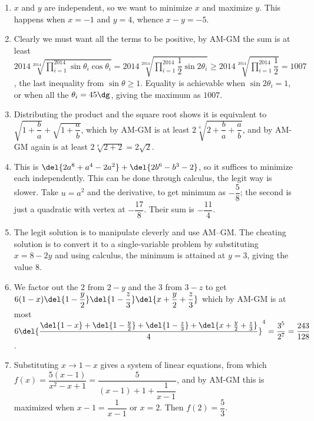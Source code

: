 \documentclass[10pt,paper=letter]{scrartcl}
\begin{document}
\begin{enumerate}

\item $x$ and $y$ are independent, so we want to minimize $x$ and maximize $y$. This happens when $x = -1$ and $y = 4$, whence $x - y = -5$.

\item Clearly we must want all the terms to be positive, by AM-GM the sum is at least $2014\sqrt[2014]{\displaystyle \prod_{i=1}^{2014} \sin \theta_i \cos \theta_i} = 2014\sqrt[2014]{\displaystyle \prod_{i=1}^{2014} \dfrac12\sin2\theta_i} \geq 2014\sqrt[2014]{\displaystyle \prod_{i=1}^{2014} \dfrac12} = 1007$, the last inequality from $\sin \theta \geq 1$. Equality is achievable when $\sin 2\theta_i = 1$, or when all the $\theta_i = 45\dg$, giving the maximum as $1007$.

\item Distributing the product and the square root shows it is equivalent to $\sqrt{1 + \dfrac{b}a} + \sqrt{1 + \dfrac{a}b}$, which by AM-GM is at least $2\sqrt[4]{2 + \dfrac{b}a + \dfrac{a}b}$, and by AM-GM again is at least $2\sqrt[4]{2 + 2} = 2\sqrt2$. 

\item This is $\del{2a^8 + a^4 - 2a^2} + \del{2b^6 - b^3 - 2}$, so it suffices to minimize each independently. This can be done through calculus, the legit way is slower. Take $u = a^2$ and the derivative, to get minimum as $-\dfrac58$; the second is just a quadratic with vertex at $-\dfrac{17}8$. Their sum is $-\dfrac{11}4$.

\item The legit solution is to manipulate cleverly and use AM--GM. The cheating solution is to convert it to a single-variable problem by substituting $x = 8 -2y$ and using calculus, the minimum is attained at $y = 3$, giving the value $8$. 

\item We factor out the $2$ from $2-y$ and the $3$ from $3-z$ to get $6(1-x)\del{1-\dfrac{y}2}\del{1-\dfrac{z}3}\del{x + \dfrac{y}2 + \dfrac{z}3}$ which by AM-GM is at most $6\del{\dfrac{\del{1-x} + \del{1-\frac{y}2} + \del{1 - \frac{z}3} + \del{x + \frac{y}2 + \frac{z}3}}4}^4 = \dfrac{3^5}{2^7} = \dfrac{243}{128}$.

\item Substituting $x \to 1-x$ gives a system of linear equations, from which $f(x) = \dfrac{5(x-1)}{x^2 - x + 1} = \dfrac5{(x-1) + 1 + \dfrac1{x-1}}$, and by AM-GM this is maximized when $x-1 = \dfrac1{x-1}$ or $x = 2$. Then $f(2) = \dfrac53$.


\end{enumerate}
\end{document}
